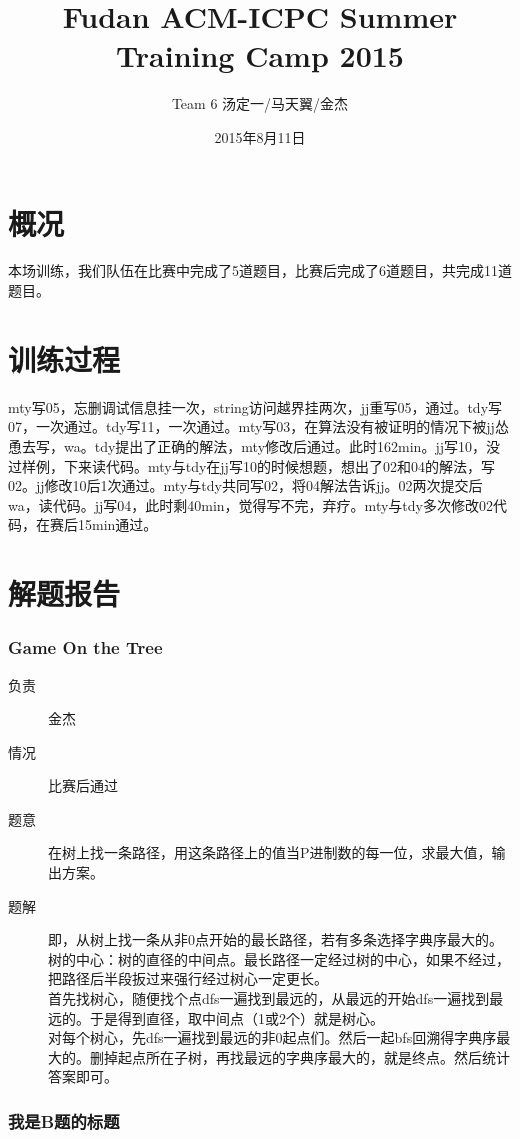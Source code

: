 \documentclass[a4paper, 11pt, nofonts, nocap, fancyhdr]{ctexart}
\title{Fudan ACM-ICPC Summer Training Camp 2015}
\author{Team 6 汤定一/马天翼/金杰}
\date{2015年8月11日}
\newcommand{\problem}[1]{\subsubsection{#1}}
\begin{document}
\maketitle

\section{概况}

本场训练，我们队伍在比赛中完成了5道题目，比赛后完成了6道题目，共完成11道题目。

\section{训练过程}

mty写05，忘删调试信息挂一次，string访问越界挂两次，jj重写05，通过。tdy写07，一次通过。tdy写11，一次通过。mty写03，在算法没有被证明的情况下被jj怂恿去写，wa。tdy提出了正确的解法，mty修改后通过。此时162min。jj写10，没过样例，下来读代码。mty与tdy在jj写10的时候想题，想出了02和04的解法，写02。jj修改10后1次通过。mty与tdy共同写02，将04解法告诉jj。02两次提交后wa，读代码。jj写04，此时剩40min，觉得写不完，弃疗。mty与tdy多次修改02代码，在赛后15min通过。

\section{解题报告}

\problem{Game On the Tree}

\begin{description}
\item[负责] 金杰
\item[情况] 比赛后通过
\item[题意]
在树上找一条路径，用这条路径上的值当P进制数的每一位，求最大值，输出方案。
\item[题解]
即，从树上找一条从非0点开始的最长路径，若有多条选择字典序最大的。\\
树的中心：树的直径的中间点。最长路径一定经过树的中心，如果不经过，把路径后半段扳过来强行经过树心一定更长。\\
首先找树心，随便找个点dfs一遍找到最远的，从最远的开始dfs一遍找到最远的。于是得到直径，取中间点（1或2个）就是树心。\\
对每个树心，先dfs一遍找到最远的非0起点们。然后一起bfs回溯得字典序最大的。删掉起点所在子树，再找最远的字典序最大的，就是终点。然后统计答案即可。

\end{description}

\problem{我是B题的标题}
\end{document}
